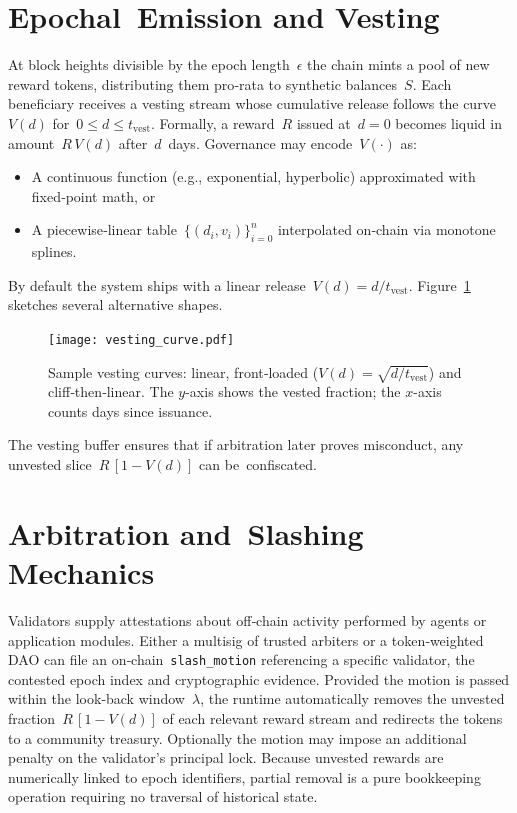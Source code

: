 \documentclass[11pt]{article}
\newcommand{\code}[1]{\texttt{#1}}
\begin{document}
\section{Epochal Emission and Vesting}
At block heights divisible by the epoch length~\(\epsilon\) the chain mints a pool of new reward tokens, distributing them pro‑rata to synthetic balances~\(S\). Each beneficiary receives a vesting stream whose cumulative release follows the curve~\(V(d)\) for~\(0\le d\le t_{\text{vest}}\). Formally, a reward~\(R\) issued at \(d=0\) becomes liquid in amount~\(R\,V(d)\) after~\(d\) days. Governance may encode~\(V(\cdot)\) as:
\begin{itemize}
  \item A continuous function (e.g., exponential, hyperbolic) approximated with fixed‑point math, or
  \item A piecewise‑linear table~\(\{(d_i,v_i)\}_{i=0}^n\) interpolated on‑chain via monotone splines.
\end{itemize}
By default the system ships with a linear release~\(V(d)=d/t_{\text{vest}}\). Figure~\ref{fig:vesting} sketches several alternative shapes.
\begin{figure}[h]
\centering
\texttt{[image: vesting\_curve.pdf]}
\caption{Sample vesting curves: linear, front‑loaded (\(V(d)=\sqrt{d/t_{\text{vest}}}\)) and cliff‑then‑linear. The \(y\)-axis shows the vested fraction; the \(x\)-axis counts days since issuance.}
\label{fig:vesting}
\end{figure}
The vesting buffer ensures that if arbitration later proves misconduct, any unvested slice~\(R\,[1-V(d)]\) can be confiscated.

\section{Arbitration and Slashing Mechanics}
Validators supply attestations about off‑chain activity performed by agents or application modules. Either a multisig of trusted arbiters or a token‑weighted DAO can file an on‑chain \code{slash\_motion} referencing a specific validator, the contested epoch index and cryptographic evidence. Provided the motion is passed within the look‑back window~\(\lambda\), the runtime automatically removes the unvested fraction~\(R\,[1-V(d)]\) of each relevant reward stream and redirects the tokens to a community treasury. Optionally the motion may impose an additional penalty on the validator’s principal lock. Because unvested rewards are numerically linked to epoch identifiers, partial removal is a pure bookkeeping operation requiring no traversal of historical state.
\end{document}
